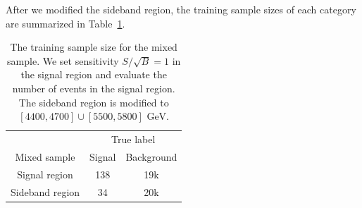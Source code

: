 \documentclass[12pt]{article}
\begin{document}
        After we modified the sideband region, the training sample sizes of each category are summarized in Table~\ref{tab:training_sample_size_cwola_hunting_hv_new_SB}.
        \begin{table}[htpb]
            \centering
            \caption{The training sample size for the mixed sample. We set sensitivity $S / \sqrt{B} = 1$ in the signal region and evaluate the number of events in the signal region. The sideband region is modified to $[4400,4700] \cup [5500,5800] \text{ GeV}$.}
            \label{tab:training_sample_size_cwola_hunting_hv_new_SB}
            \begin{tabular}{c|cc}
                                & \multicolumn{2}{c}{True label} \\
                Mixed sample    & Signal       & Background      \\ \hline
                Signal region   & 138          & 19k             \\
                Sideband region & 34           & 20k
            \end{tabular}
        \end{table}
\end{document}
